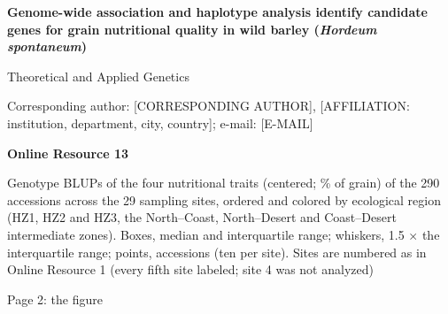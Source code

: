 \documentclass[10pt]{article}
\begin{document}
{\large\bfseries Genome-wide association and haplotype analysis identify candidate genes for grain nutritional quality in wild barley (\textit{Hordeum spontaneum})\par}\vspace{3mm}
Theoretical and Applied Genetics\par
[AUTHOR NAMES]\par
Corresponding author: [CORRESPONDING AUTHOR], [AFFILIATION: institution, department, city, country]; e-mail: [E-MAIL]\par\vspace{10mm}
{\large\bfseries Online Resource 13\par}\vspace{3mm}
Genotype BLUPs of the four nutritional traits (centered; \% of grain) of the 290 accessions across the 29 sampling sites, ordered and colored by ecological region (HZ1, HZ2 and HZ3, the North–Coast, North–Desert and Coast–Desert intermediate zones). Boxes, median and interquartile range; whiskers, 1.5 × the interquartile range; points, accessions (ten per site). Sites are numbered as in Online Resource 1 (every fifth site labeled; site 4 was not analyzed)\par\vspace{6mm}
{\small Page 2: the figure}
\end{document}
